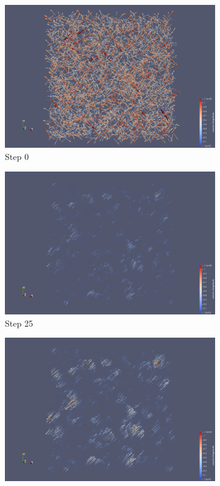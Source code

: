 \documentclass[a4paper,12pt]{article}
\begin{document}
\begin{figure}
\centering
\begin{subfigure}{0.4\textwidth}
    \includegraphics[width=\textwidth]{../images/vtk/bonus/velocity/step_0.png}
    \caption{Step 0}
\end{subfigure}
\hfill
\begin{subfigure}{0.4\textwidth}
    \includegraphics[width=\textwidth]{../images/vtk/bonus/velocity/step_25.png}
    \caption{Step 25}
\end{subfigure}
\hfill
\begin{subfigure}{0.4\textwidth}
    \includegraphics[width=\textwidth]{../images/vtk/bonus/velocity/step_50.png}

\end{subfigure}
\end{figure}
\end{document}

